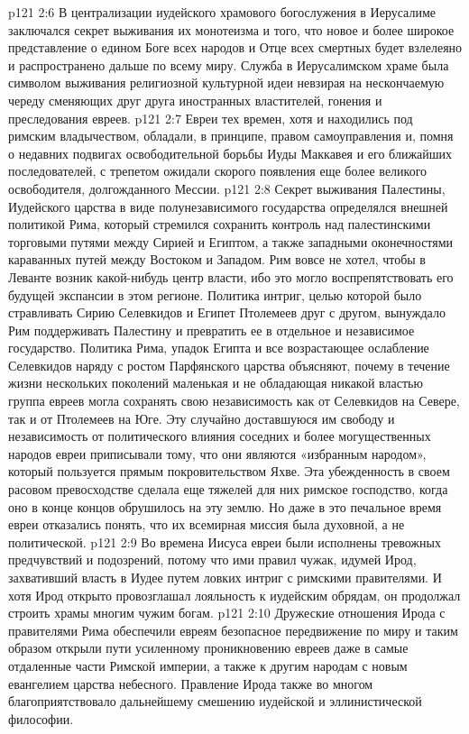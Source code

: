 \vs p121 2:6 В централизации иудейского храмового богослужения в Иерусалиме заключался секрет выживания их монотеизма и того, что новое и более широкое представление о едином Боге всех народов и Отце всех смертных будет взлелеяно и распространено дальше по всему миру. Служба в Иерусалимском храме была символом выживания религиозной культурной идеи невзирая на нескончаемую череду сменяющих друг друга иностранных властителей, гонения и преследования евреев.
\vs p121 2:7 \pc Евреи тех времен, хотя и находились под римским владычеством, обладали, в принципе, правом самоуправления и, помня о недавних подвигах освободительной борьбы Иуды Маккавея и его ближайших последователей, с трепетом ожидали скорого появления еще более великого освободителя, долгожданного Мессии.
\vs p121 2:8 Секрет выживания Палестины, Иудейского царства в виде полунезависимого государства определялся внешней политикой Рима, который стремился сохранить контроль над палестинскими торговыми путями между Сирией и Египтом, а также западными оконечностями караванных путей между Востоком и Западом. Рим вовсе не хотел, чтобы в Леванте возник какой\hyp{}нибудь центр власти, ибо это могло воспрепятствовать его будущей экспансии в этом регионе. Политика интриг, целью которой было стравливать Сирию Селевкидов и Египет Птолемеев друг с другом, вынуждало Рим поддерживать Палестину и превратить ее в отдельное и независимое государство. Политика Рима, упадок Египта и все возрастающее ослабление Селевкидов наряду с ростом Парфянского царства объясняют, почему в течение жизни нескольких поколений маленькая и не обладающая никакой властью группа евреев могла сохранять свою независимость как от Селевкидов на Севере, так и от Птолемеев на Юге. Эту случайно доставшуюся им свободу и независимость от политического влияния соседних и более могущественных народов евреи приписывали тому, что они являются «избранным народом», который пользуется прямым покровительством Яхве. Эта убежденность в своем расовом превосходстве сделала еще тяжелей для них римское господство, когда оно в конце концов обрушилось на эту землю. Но даже в это печальное время евреи отказались понять, что их всемирная миссия была духовной, а не политической.
\vs p121 2:9 \pc Во времена Иисуса евреи были исполнены тревожных предчувствий и подозрений, потому что ими правил чужак, идумей Ирод, захвативший власть в Иудее путем ловких интриг с римскими правителями. И хотя Ирод открыто провозглашал лояльность к иудейским обрядам, он продолжал строить храмы многим чужим богам.
\vs p121 2:10 Дружеские отношения Ирода с правителями Рима обеспечили евреям безопасное передвижение по миру и таким образом открыли пути усиленному проникновению евреев даже в самые отдаленные части Римской империи, а также к другим народам с новым евангелием царства небесного. Правление Ирода также во многом благоприятствовало дальнейшему смешению иудейской и эллинистической философии.
